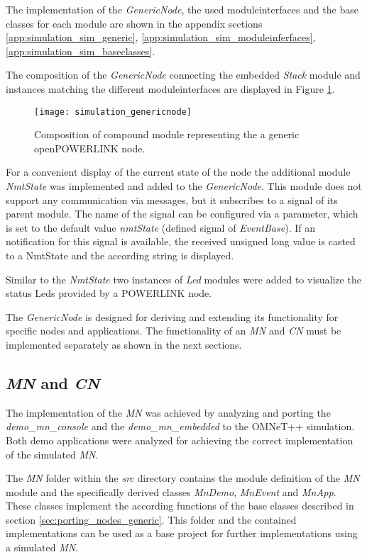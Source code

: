 The implementation of the \emph{GenericNode}, the used moduleinterfaces and the base classes for each module are shown in the appendix sections \ref{app:simulation_sim_generic}, \ref{app:simulation_sim_moduleinferfaces}, \ref{app:simulation_sim_baseclasses}.

The composition of the \emph{GenericNode} connecting the embedded \emph{Stack} module and instances matching the different moduleinterfaces are displayed in Figure \ref{fig:simulation_genericnode}.

\begin{figure}
    \centering
    \texttt{[image: simulation\_genericnode]}
    \caption{Composition of compound module representing the a generic openPOWERLINK node.}
    \label{fig:simulation_genericnode}
\end{figure}

For a convenient display of the current state of the node the additional module \emph{NmtState} was implemented and added to the \emph{GenericNode}.
This module does not support any communication via messages, but it subscribes to a signal of its parent module.
The name of the signal can be configured via a parameter, which is set to the default value \emph{nmtState} (defined signal of \emph{EventBase}).
If an notification for this signal is available, the received unsigned long value is casted to a NmtState and the according string is displayed.

Similar to the \emph{NmtState} two instances of \emph{Led} modules were added to visualize the status Leds provided by a POWERLINK node.

The \emph{GenericNode} is designed for deriving and extending its functionality for specific nodes and applications.
The functionality of an \emph{MN} and \emph{CN} must be implemented separately as shown in the next sections.

\subsection{\emph{MN} and \emph{CN}}
\label{sec:porting_nodes_mn_cm}
The implementation of the \emph{MN} was achieved by analyzing and porting the \emph{demo\_mn\_console} and the \emph{demo\_mn\_embedded} to the OMNeT++ simulation.
Both demo applications were analyzed for achieving the correct implementation of the simulated \emph{MN}.

The \emph{MN} folder within the \emph{src} directory contains the module definition of the \emph{MN} module and the specifically derived classes \emph{MnDemo}, \emph{MnEvent} and \emph{MnApp}.
These classes implement the according functions of the base classes described in section \ref{sec:porting_nodes_generic}.
This folder and the contained implementations can be used as a base project for further implementations using a simulated \emph{MN}.


